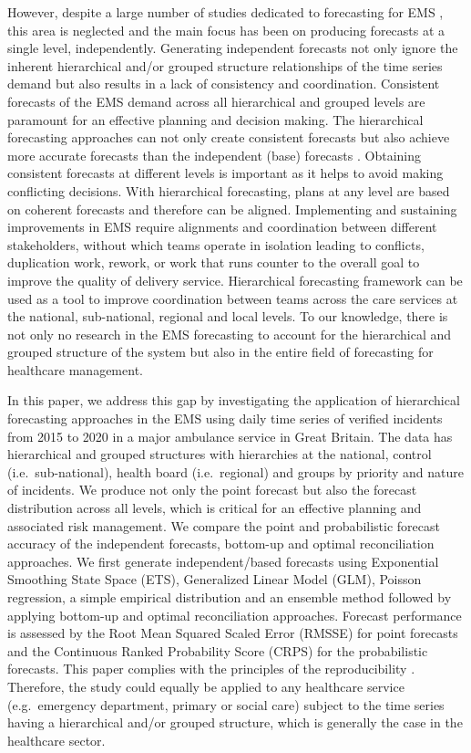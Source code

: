 \documentclass[
  authoryear,
  preprint,
  3p]{elsarticle}
\begin{document}
However, despite a large number of studies dedicated to forecasting for
EMS
\citep{mingliterature2022, gul2020exhaustive, ibrahim2016modeling, wargon2009systematic},
this area is neglected and the main focus has been on producing
forecasts at a single level, independently. Generating independent
forecasts not only ignore the inherent hierarchical and/or grouped
structure relationships of the time series demand but also results in a
lack of consistency and coordination. Consistent forecasts of the EMS
demand across all hierarchical and grouped levels are paramount for an
effective planning and decision making. The hierarchical forecasting
approaches can not only create consistent forecasts but also achieve
more accurate forecasts than the independent (base) forecasts
\citep{hyndman2011optimal}. Obtaining consistent forecasts at different
levels is important as it helps to avoid making conflicting decisions.
With hierarchical forecasting, plans at any level are based on coherent
forecasts and therefore can be aligned. Implementing and sustaining
improvements in EMS require alignments and coordination between
different stakeholders, without which teams operate in isolation leading
to conflicts, duplication work, rework, or work that runs counter to the
overall goal to improve the quality of delivery service. Hierarchical
forecasting framework can be used as a tool to improve coordination
between teams across the care services at the national, sub-national,
regional and local levels. To our knowledge, there is not only no
research in the EMS forecasting to account for the hierarchical and
grouped structure of the system but also in the entire field of
forecasting for healthcare management.

In this paper, we address this gap by investigating the application of
hierarchical forecasting approaches in the EMS using daily time series
of verified incidents from 2015 to 2020 in a major ambulance service in
Great Britain. The data has hierarchical and grouped structures with
hierarchies at the national, control (i.e.~sub-national), health board
(i.e.~regional) and groups by priority and nature of incidents. We
produce not only the point forecast but also the forecast distribution
across all levels, which is critical for an effective planning and
associated risk management. We compare the point and probabilistic
forecast accuracy of the independent forecasts, bottom-up and optimal
reconciliation approaches. We first generate independent/based forecasts
using Exponential Smoothing State Space (ETS), Generalized Linear Model
(GLM), Poisson regression, a simple empirical distribution and an
ensemble method followed by applying bottom-up and optimal
reconciliation approaches. Forecast performance is assessed by the Root
Mean Squared Scaled Error (RMSSE) for point forecasts and the Continuous
Ranked Probability Score (CRPS) for the probabilistic forecasts. This
paper complies with the principles of the reproducibility
\citep{stodden2013best, boylan2015reproducibility}. Therefore, the study
could equally be applied to any healthcare service (e.g.~emergency
department, primary or social care) subject to the time series having a
hierarchical and/or grouped structure, which is generally the case in
the healthcare sector.
\end{document}
